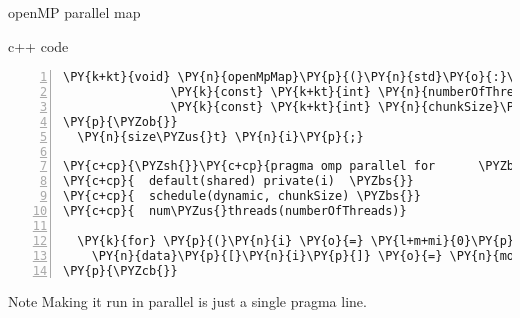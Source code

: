 \documentclass{beamer}
\begin{document}
\begin{frame}[fragile]{openMP parallel map}

\begin{block}{c++ code}

\tiny
\begin{Verbatim}[commandchars=\\\{\},numbers=left,firstnumber=1,stepnumber=1]
\PY{k+kt}{void} \PY{n}{openMpMap}\PY{p}{(}\PY{n}{std}\PY{o}{:}\PY{o}{:}\PY{n}{vector}\PY{o}{<}\PY{k+kt}{float}\PY{o}{>}\PY{o}{&} \PY{n}{data}\PY{p}{,}
               \PY{k}{const} \PY{k+kt}{int} \PY{n}{numberOfThreads}\PY{p}{,}
               \PY{k}{const} \PY{k+kt}{int} \PY{n}{chunkSize}\PY{p}{)}
\PY{p}{\PYZob{}}
  \PY{n}{size\PYZus{}t} \PY{n}{i}\PY{p}{;}

\PY{c+cp}{\PYZsh{}}\PY{c+cp}{pragma omp parallel for      \PYZbs{}}
\PY{c+cp}{  default(shared) private(i)  \PYZbs{}}
\PY{c+cp}{  schedule(dynamic, chunkSize) \PYZbs{}}
\PY{c+cp}{  num\PYZus{}threads(numberOfThreads)}

  \PY{k}{for} \PY{p}{(}\PY{n}{i} \PY{o}{=} \PY{l+m+mi}{0}\PY{p}{;} \PY{n}{i} \PY{o}{<} \PY{n}{data}\PY{p}{.}\PY{n}{size}\PY{p}{(}\PY{p}{)}\PY{p}{;} \PY{n}{i}\PY{o}{+}\PY{o}{+}\PY{p}{)}
    \PY{n}{data}\PY{p}{[}\PY{n}{i}\PY{p}{]} \PY{o}{=} \PY{n}{modify}\PY{p}{(}\PY{n}{data}\PY{p}{[}\PY{n}{i}\PY{p}{]}\PY{p}{)}\PY{p}{;}
\PY{p}{\PYZcb{}}
\end{Verbatim}

\end{block}

\begin{exampleblock}{Note}
\small
Making it run in parallel is just a single pragma line.
\end{exampleblock}

\end{frame}

\end{document}
